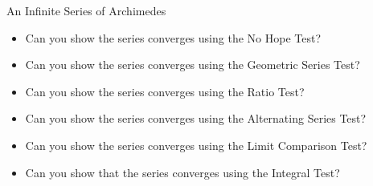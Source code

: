 \begin{exercise}{An Infinite Series of Archimedes \Coffeecup \Coffeecup \Coffeecup }
\begin{itemize}
\item Can you show the series converges using the No Hope Test?

\vspace*{.5in}

\item Can you show the series converges using the Geometric Series Test?

\vspace*{.5in}

\item Can you show the series converges using the Ratio Test?

\vspace*{.5in}

\item Can you show the series converges using the Alternating Series Test?

\vspace*{.5in}

\item Can you show the series converges using the Limit Comparison Test? 

\vspace*{.5in}

\item Can you show that the series converges using the Integral Test?

\vspace*{.5in}

\end{itemize}
\end{exercise}